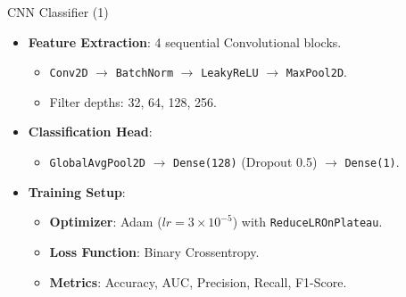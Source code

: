 \documentclass[aspectratio=169]{iticslides}
\begin{document}
\begin{frame}{CNN Classifier (1)}
  \begin{itemize}
  \item \textbf{Feature Extraction}: 4 sequential Convolutional blocks.
    \begin{itemize}
    \item \texttt{Conv2D} $\rightarrow$ \texttt{BatchNorm} $\rightarrow$ \texttt{LeakyReLU} $\rightarrow$ \texttt{MaxPool2D}.
    \item Filter depths: 32, 64, 128, 256.
    \end{itemize}
    
    \vspace{0.4cm}
    
  \item \textbf{Classification Head}: 
    \begin{itemize}
    \item \texttt{GlobalAvgPool2D} $\rightarrow$ \texttt{Dense(128)} (Dropout 0.5) $\rightarrow$ \texttt{Dense(1)}.
    \end{itemize}

    \vspace{0.4cm}

  \item \textbf{Training Setup}:
    \begin{itemize}
    \item \textbf{Optimizer}: Adam ($lr = 3 \times 10^{-5}$) with \texttt{ReduceLROnPlateau}.
    \item \textbf{Loss Function}: Binary Crossentropy.
    \item \textbf{Metrics}: Accuracy, AUC, Precision, Recall, F1-Score.
    \end{itemize}
  \end{itemize}
\end{frame}
\end{document}
